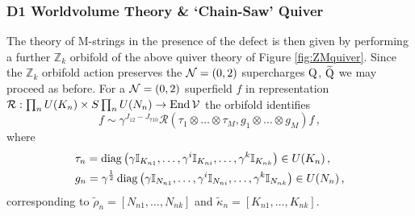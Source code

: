 \documentclass[main.tex]{subfiles}
\begin{document}
\subsubsection{D1 Worldvolume Theory \& `Chain-Saw' Quiver}
The theory of M-strings in the presence of the defect is then given by performing a further $\mathbb{Z}_k$ orbifold of the above quiver theory of Figure \ref{fig:ZMquiver}. Since the $\mathbb{Z}_k$ orbifold action preserves the $\mathcal{N}=(0,2)$ supercharges $\mathrm{Q}$, $\widetilde{\mathrm{Q}}$ we may proceed as before. For a $\mathcal{N}=(0,2)$ superfield $f$ in representation $\mathcal{R}:\prod_{n}U(K_n)\times S\prod_nU(N_n)\to \operatorname{End}\mathcal{V}$ the orbifold identifies
\begin{equation}\label{eqn:orbactiongauge}
f\sim \gamma^{J_{12}-J_{710}}\mathcal{R}\left(\tau_1\otimes\dots\otimes\tau_M,g_1\otimes\dots\otimes g_M\right)f\,,
\end{equation}
where 
\begin{align}
&\tau_n=\operatorname{diag}\left(\gamma\mathbb{I}_{K_{n1}},\dots,\gamma^i\mathbb{I}_{K_{ni}},\dots,\gamma^k\mathbb{I}_{K_{nk}}\right)\in U(K_n)\,,\\
&g_n=\gamma^{\frac{1}{2}}\operatorname{diag}\left(\gamma\mathbb{I}_{N_{n1}},\dots,\gamma^i\mathbb{I}_{N_{ni}},\dots,\gamma^k\mathbb{I}_{N_{nk}}\right)\in U(N_n)\,,
\end{align}
corresponding to $\tilde{\rho}_n=[N_{n1},\dots,N_{nk}]$ and $\tilde{\kappa}_n=[K_{n1},\dots,K_{nk}]$.
\end{document}
